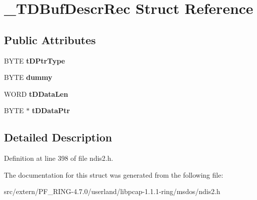 \hypertarget{struct___t_d_buf_descr_rec}{
\section{\_\-TDBufDescrRec Struct Reference}
\label{struct___t_d_buf_descr_rec}
}
\subsection*{Public Attributes}
\begin{DoxyCompactItemize}
\item 
\hypertarget{struct___t_d_buf_descr_rec_ae48cefb04baf73ae75000bd5015567c1}{
BYTE {\bfseries tDPtrType}}
\label{struct___t_d_buf_descr_rec_ae48cefb04baf73ae75000bd5015567c1}

\item 
\hypertarget{struct___t_d_buf_descr_rec_a0fb400597876134bc268dbc6443e68c5}{
BYTE {\bfseries dummy}}
\label{struct___t_d_buf_descr_rec_a0fb400597876134bc268dbc6443e68c5}

\item 
\hypertarget{struct___t_d_buf_descr_rec_af19a8c18e05874065f497fc140df24bc}{
WORD {\bfseries tDDataLen}}
\label{struct___t_d_buf_descr_rec_af19a8c18e05874065f497fc140df24bc}

\item 
\hypertarget{struct___t_d_buf_descr_rec_a2a0e7ad70976a8451c04c8ce9a225047}{
BYTE $\ast$ {\bfseries tDDataPtr}}
\label{struct___t_d_buf_descr_rec_a2a0e7ad70976a8451c04c8ce9a225047}

\end{DoxyCompactItemize}


\subsection{Detailed Description}


Definition at line 398 of file ndis2.h.



The documentation for this struct was generated from the following file:\begin{DoxyCompactItemize}
\item 
src/extern/PF\_\-RING-\/4.7.0/userland/libpcap-\/1.1.1-\/ring/msdos/ndis2.h\end{DoxyCompactItemize}
